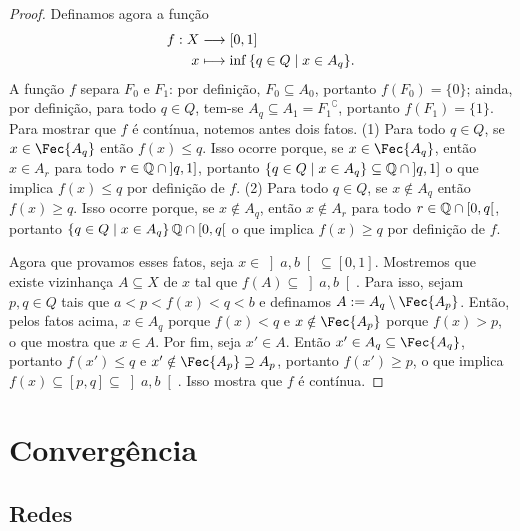 \begin{proof}
Definamos agora a função
	\begin{align*}
	{f}: {X} &\longrightarrow {[0,1]} \\{x} &\longmapsto {\inf\left\{q \in Q \;\middle\vert\; x \in A_q \right\}}.
	\end{align*}
A função $f$ separa $F_0$ e $F_1$: por definição, $F_0 \subseteq A_0$, portanto $f(F_0)=\{0\}$; ainda, por definição, para todo $q \in Q$, tem-se $A_q \subseteq A_1={F_1}^\complement$, portanto $f(F_1)=\{1\}$. Para mostrar que $f$ é contínua, notemos antes dois fatos. (1) Para todo $q \in Q$, se $x \in \Fec{A_q}$ então $f(x) \leq q$. Isso ocorre porque, se $x \in \Fec{A_q}$, então $x \in A_r$ para todo $r \in \mathbb{Q} \cap \left]q,1\right]$, portanto $\left\{q \in Q \;\middle\vert\; x \in A_q \right\} \subseteq \mathbb{Q} \cap \left]q,1\right]$ o que implica $f(x) \leq q$ por definição de $f$. (2) Para todo $q \in Q$, se $x \notin A_q$ então $f(x) \geq q$. Isso ocorre porque, se $x \notin A_q$, então $x \notin A_r$ para todo $r \in \mathbb{Q} \cap \left[0,q\right[$, portanto $\left\{q \in Q \;\middle\vert\; x \in A_q \right\}\mathbb{Q} \cap \left[0,q\right[$ o que implica $f(x) \geq q$ por definição de $f$.

Agora que provamos esses fatos, seja $x \in \left]a,b\right[ \subseteq [0,1]$. Mostremos que existe vizinhança $A \subseteq X$ de $x$ tal que $f(A) \subseteq \left]a,b\right[$. Para isso, sejam $p,q \in Q$ tais que $a<p<f(x)<q<b$ e definamos $A:=A_q \setminus \Fec{A_p}$. Então, pelos fatos acima, $x \in A_q$ porque $f(x)<q$ e $x \notin \Fec{A_p}$ porque $f(x)>p$, o que mostra que $x \in A$. Por fim, seja $x' \in A$. Então $x' \in A_q \subseteq \Fec{A_q}$, portanto $f(x') \leq q$ e $x' \notin \Fec{A_p} \supseteq A_p$, portanto $f(x') \geq p$, o que implica $f(x) \subseteq [p,q] \subseteq \left]a,b\right[$. Isso mostra que $f$ é contínua.
\end{proof}






\section{Convergência}

\subsection{Redes}

